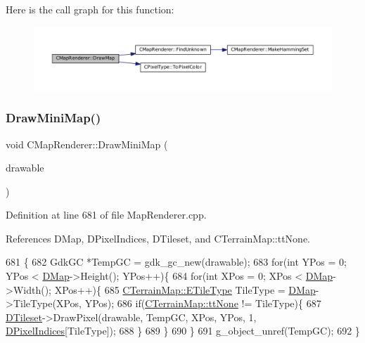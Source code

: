 Here is the call graph for this function\+:\nopagebreak
\begin{figure}[H]
\begin{center}
\leavevmode
\includegraphics[width=350pt]{classCMapRenderer_a26786befd5d6d0b09210736916d1b912_cgraph}
\end{center}
\end{figure}
\hypertarget{classCMapRenderer_ae5c68b6a4892eb8b9e7a4d8afb4e344e}{}\label{classCMapRenderer_ae5c68b6a4892eb8b9e7a4d8afb4e344e} 
\subsubsection{\texorpdfstring{Draw\+Mini\+Map()}{DrawMiniMap()}}
{\footnotesize\ttfamily void C\+Map\+Renderer\+::\+Draw\+Mini\+Map (\begin{DoxyParamCaption}\item[{Gdk\+Drawable $\ast$}]{drawable }\end{DoxyParamCaption})}



Definition at line 681 of file Map\+Renderer.\+cpp.



References D\+Map, D\+Pixel\+Indices, D\+Tileset, and C\+Terrain\+Map\+::tt\+None.


\begin{DoxyCode}
681                                                    \{
682     GdkGC *TempGC = gdk\_gc\_new(drawable);
683     \textcolor{keywordflow}{for}(\textcolor{keywordtype}{int} YPos = 0; YPos < \hyperlink{classCMapRenderer_ab9a199c61aa1c87a3248af3085d8ba52}{DMap}->Height(); YPos++)\{
684         \textcolor{keywordflow}{for}(\textcolor{keywordtype}{int} XPos = 0; XPos < \hyperlink{classCMapRenderer_ab9a199c61aa1c87a3248af3085d8ba52}{DMap}->Width(); XPos++)\{
685             \hyperlink{classCTerrainMap_aff2ab991e237269941416dd79d8871d4}{CTerrainMap::ETileType} TileType = \hyperlink{classCMapRenderer_ab9a199c61aa1c87a3248af3085d8ba52}{DMap}->TileType(XPos, YPos);
686             \textcolor{keywordflow}{if}(\hyperlink{classCTerrainMap_aff2ab991e237269941416dd79d8871d4a481e779132fb16414d17870bd6229eb5}{CTerrainMap::ttNone} != TileType)\{
687                 \hyperlink{classCMapRenderer_ace0648cba050b5e02431096edd15b836}{DTileset}->DrawPixel(drawable, TempGC, XPos, YPos, 1, 
      \hyperlink{classCMapRenderer_af636936c20248c3ee6cb6ec46f18f077}{DPixelIndices}[TileType]);
688             \}
689         \}
690     \}
691     g\_object\_unref(TempGC);
692 \}
\end{DoxyCode}
\hypertarget{classCMapRenderer_aec3c1d3294ac3af8ebb717ed5be88870}{}\label{classCMapRenderer_aec3c1d3294ac3af8ebb717ed5be88870} 
